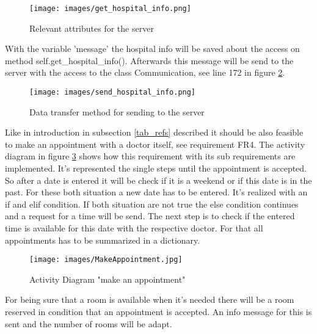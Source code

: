 \begin{figure}[H]
\centering
\sidecaption
\texttt{[image: images/get\_hospital\_info.png]}
\caption{Relevant attributes for the server}
\label{Relevant_attributes_server}
\end{figure}

With the variable 'message' the hospital info will be saved about the access on method self.get_hospital_info(). Afterwards this message will be send to the server with the access to the class Communication, see line 172 in figure \ref{send_hosp_info}. 


\begin{figure}[H]
\centering
\sidecaption
\texttt{[image: images/send\_hospital\_info.png]}
\caption{Data transfer method for sending to the server}
\label{send_hosp_info}
\end{figure}

Like in introduction in subsection \ref{tab_refs} described it should be also feasible to make an appointment with a doctor itself, see requirement FR4. The activity diagram in figure \ref{Make_Appointment} shows how this requirement with its sub requirements are implemented. It's represented the single steps until the appointment is accepted. So after a date is entered it will be check if it is a weekend or if this date is in the past. For these both situation a new date has to be entered. It's realized with an if and elif condition. If both situation are not true the else condition continues and a request for a time will be send. The next step is to check if the entered time is available for this date with the respective doctor. For that all appointments has to be summarized in a dictionary.

\begin{figure}[H]
\centering
\sidecaption
\texttt{[image: images/MakeAppointment.jpg]}
\caption{Activity Diagram "make an appointment"}
\label{Make_Appointment}
\end{figure}

For being sure that a room is available when it's needed there will be a room reserved in condition that an appointment is accepted. An info message for this is sent and the number of rooms will be adapt. %


